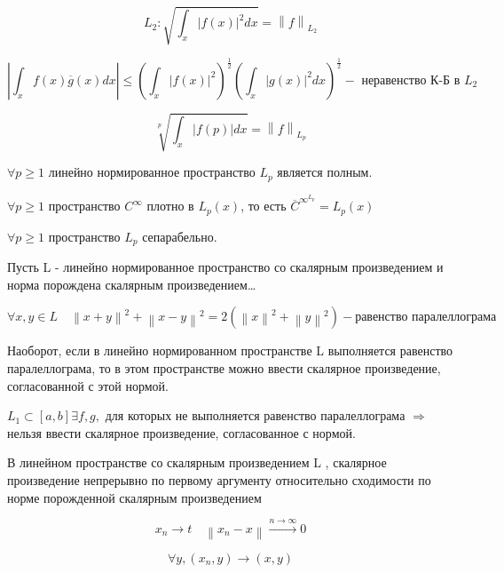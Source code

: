 \documentclass[12pt, a4paper]{report}
\begin{document}
\[ L_2 : \sqrt{ \int  _x |f(x)| ^2 dx    } = \left\lVert f  \right\rVert _{L_2}  \] 

\[ \left\lvert \int_{x }  f (x ) \overline{g }  (x ) dx        \right\rvert  \le  \left( \int_{x }|f(x ) | ^2 \right) ^{\frac{1}{2 } } \left( \int_{x } |g(x)| ^2 dx   \right) ^{\frac{1}{2} } - \text{ неравенство К-Б в }  L_2     \] 

\[ \sqrt[  p ]{\int_{x }|f(p)|dx}= \left\lVert f  \right\rVert _{L_p} \]  

\begin{lemma}
    \( \forall p \geq 1   \) линейно нормированное пространство  \( L_ p   \)  является полным.  
\end{lemma}

\begin{lemma}
    \( \forall  p \geq 1   \)  пространство \( C^{\infty }  \) плотно в \( L_p (x) \), то есть \( \overline{C}^{\infty ^{L_p} }= L_p(x)    \)   
\end{lemma}

\begin{lemma}
    \( \forall  p \ge 1  \)  пространство \( L _ p  \)  сепарабельно.
\end{lemma}

\begin{lemma}
    Пусть L - линейно нормированное пространство со скалярным произведением и норма порождена скалярным произведением\dots

    \[ \forall  x, y \in  L \quad  \left\lVert x+ y  \right\rVert ^2 + \left\lVert  x- y  \right\rVert ^2 = 2 (\left\lVert x   \right\rVert ^2 + \left\lVert y  \right\rVert ^2) - \text{равенство паралеллограма} \] 
\end{lemma}

Наоборот, если в линейно нормированном пространстве L выполняется равенство паралеллограма, то в этом пространстве можно ввести скалярное произведение, согласованной с этой нормой.

\( L_1 \subset [ a, b ] \exists  f,g ,   \)  для которых не выполняется равенство паралеллограма \( \Rightarrow      \) нельзя ввести скалярное произведение, согласованное с нормой.

\begin{lemma}
    В линейном  пространстве со скалярным произведением  L , скалярное произведение непрерывно по первому аргументу относительно сходимости по норме порожденной скалярным произведением

    \[ x_n \to  t \quad \left\lVert x_n - x           \right\rVert  \xrightarrow{n \to  \infty }  0  \] 

    \[ \forall y , (x_n, y  ) \to  (x, y ) \] 
\end{lemma}
\end{document}
